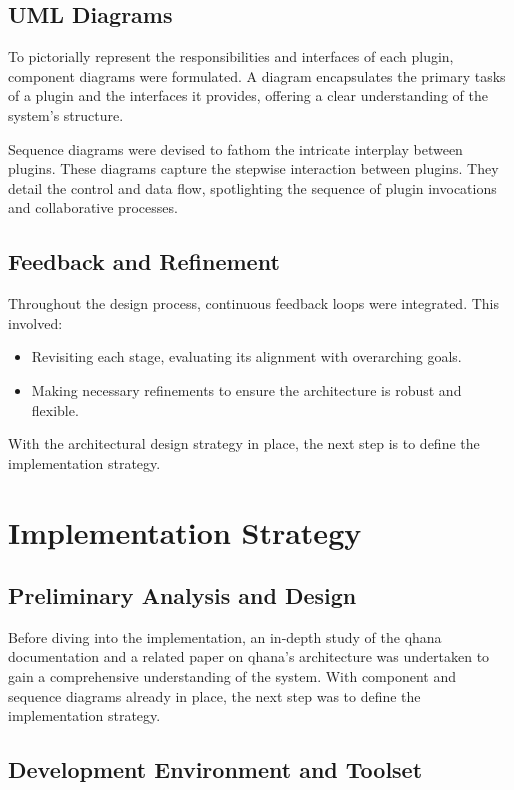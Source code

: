 \documentclass[
  a4paper,  %
  twoside,  %
  bibliography=totoc,
  headsepline,
  cleardoublepage=empty,
  parskip=half,
  draft=false
]{scrbook}
\begin{document}
\subsection{UML Diagrams}
To pictorially represent the responsibilities and interfaces of each plugin, component diagrams were formulated.
A diagram encapsulates the primary tasks of a plugin and the interfaces it provides, offering a clear understanding of the system's structure.

Sequence diagrams were devised to fathom the intricate interplay between plugins.
These diagrams capture the stepwise interaction between plugins.
They detail the control and data flow, spotlighting the sequence of plugin invocations and collaborative processes.


\subsection{Feedback and Refinement}
Throughout the design process, continuous feedback loops were integrated. This involved:
\begin{itemize}
\item Revisiting each stage, evaluating its alignment with overarching goals.
\item Making necessary refinements to ensure the architecture is robust and flexible.
\end{itemize}

With the architectural design strategy in place, the next step is to define the implementation strategy.

\section{Implementation Strategy}
\label{sec:implementationStrategy}

\subsection{Preliminary Analysis and Design}
Before diving into the implementation, an in-depth study of the \gls{qhana} documentation \cite{FabianBuehler} and a related paper on \gls{qhana}'s architecture \cite{Buehler2022} was undertaken to gain a comprehensive understanding of the system.
With component and sequence diagrams already in place, the next step was to define the implementation strategy.

\subsection{Development Environment and Toolset}
\end{document}

